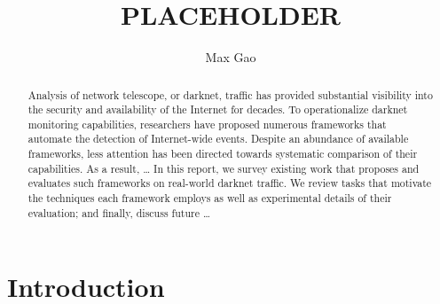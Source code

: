 \documentclass[manuscript,nonacm]{acmart}
\begin{document}
\title{PLACEHOLDER}
\author{Max Gao}

\begin{abstract}
Analysis of network telescope, or darknet, traffic has provided substantial visibility into the security and availability of the Internet for decades.
To operationalize darknet monitoring capabilities, researchers have proposed numerous frameworks that automate the detection of Internet-wide events.
Despite an abundance of available frameworks, less attention has been directed towards systematic comparison of their capabilities. 
As a result, \dots
In this report, we survey existing work that proposes and evaluates such frameworks on real-world darknet traffic.
We review tasks that motivate the techniques each framework employs as well as experimental details of their evaluation; and finally, discuss future \dots
\end{abstract}

\maketitle

\section{Introduction}
\end{document}
